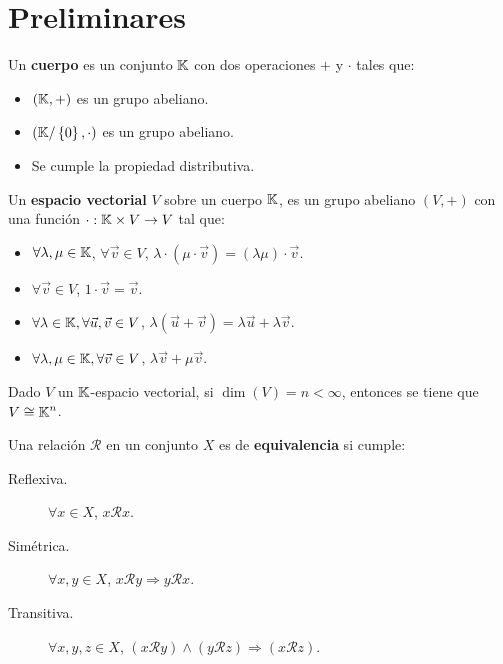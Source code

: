 \chapter{Preliminares}
\begin{definition}[Cuerpo]
Un \textbf{cuerpo} es un conjunto $\displaystyle \mathbb{K} $ con dos operaciones $\displaystyle + $ y $\displaystyle \cdot  $ tales que:
\begin{itemize}
\item $\displaystyle \left(\mathbb{K}, +\right) $ es un grupo abeliano. 
\item $\displaystyle \left(\mathbb{K}/ \left\{ 0\right\}, \cdot \right) $ es un grupo abeliano.
\item Se cumple la propiedad distributiva.
\end{itemize}
\end{definition}
\begin{definition}
Un \textbf{espacio vectorial} $\displaystyle V $ sobre un cuerpo $\displaystyle \mathbb{K} $, es un grupo abeliano $\displaystyle \left(V, +\right) $ con una función $\displaystyle \cdot : \mathbb{K} \times V \to V $ tal que:
\begin{itemize}
\item $\displaystyle \forall \lambda, \mu \in \mathbb{K} $, $\displaystyle \forall \vec{v} \in V $, $\displaystyle \lambda \cdot \left(\mu \cdot \vec{v}\right) = \left(\lambda \mu\right) \cdot \vec{v} $. 
\item $\displaystyle \forall \vec{v} \in V $, $\displaystyle 1 \cdot \vec{v} = \vec{v} $.
\item $\displaystyle \forall \lambda \in \mathbb{K}, \forall \vec{u}, \vec{v} \in V $, $\displaystyle \lambda\left(\vec{u}+\vec{v}\right) = \lambda\vec{u}+\lambda\vec{v}$. 
\item $\displaystyle \forall \lambda, \mu \in \mathbb{K}, \forall \vec{v} \in V $, $\displaystyle \lambda\vec{v}+\mu\vec{v} $.
\end{itemize}
\end{definition}
\begin{observation}
Dado $\displaystyle V $ un $\displaystyle \mathbb{K} $-espacio vectorial, si $\displaystyle \dim\left(V\right) = n < \infty $, entonces se tiene que $\displaystyle V \cong \mathbb{K}^{n} $.
\end{observation}
\begin{definition}
Una relación $\displaystyle \mathcal{R} $ en un conjunto $\displaystyle X $ es de \textbf{equivalencia} si cumple:
\begin{description}
\item[Reflexiva.] $\displaystyle \forall x \in X $, $\displaystyle x \mathcal{R} x $.
\item[Simétrica.] $\displaystyle \forall x, y \in X $, $\displaystyle x \mathcal{R} y \Rightarrow y \mathcal{R} x $.
\item[Transitiva.] $\displaystyle \forall x,y,z \in X $, $\displaystyle \left(x \mathcal{R} y\right) \land \left(y \mathcal{R} z\right) \Rightarrow \left(x \mathcal{R}z\right) $.
\end{description}
\end{definition}
